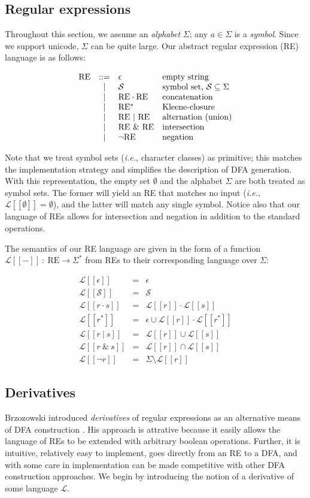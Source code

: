 \documentclass[11pt]{article}
\newcommand{\OR}{\ | \ }
\newcommand{\AND}{\ \& \ }
\newcommand{\CL}{\mathcal{L}}
\newcommand{\CS}{\mathcal{S}}
\newcommand{\Sem}[1]{[ \! [ #1 ] \! ]}
\newcommand{\Ls}[1]{\CL\Sem{#1}}
\newcommand{\ie}{{\em i.e.}}
\newcommand{\Grammar}[1]{\[ \begin{array}{rcll} #1 \end{array} \]}
\newcommand{\GFirst}[3]{#1 & ::= & #2 & \textrm{#3} \\ }
\newcommand{\GNext}[2]{ & | & #1 & \textrm{#2} \\ }
\begin{document}
\subsection{Regular expressions}

Throughout this section, we assume an \emph{alphabet} $\Sigma$; any $a \in \Sigma$ is a \emph{symbol}.  Since we support unicode, $\Sigma$ can be quite large.  Our abstract regular expression (RE) language is as follows:

\Grammar{
\GFirst{\rm RE}{\epsilon}{empty string}
\GNext{\CS}{symbol set, $\CS \subseteq \Sigma$}
\GNext{\rm RE\cdot RE}{concatenation}
\GNext{\rm RE^*}{Kleene-closure}
\GNext{\rm RE \OR RE}{alternation (union)}
\GNext{\rm RE \AND RE}{intersection}
\GNext{\neg \rm RE}{negation}
}

Note that we treat symbol sets (\ie{}, character classes) as primitive; this matches the implementation strategy and simplifies the description of DFA generation.  With this representation, the empty set $\emptyset$ and the alphabet $\Sigma$ are both treated as symbol sets.  The former will yield an RE that matches no input (\ie{}, $\CL\Sem{\emptyset} = \emptyset$), and the latter will match any single symbol.  Notice also that our language of REs allows for intersection and negation in addition to the standard operations.

The semantics of our RE language are given in the form of a function $\Ls{-} \ : \ \mathrm{RE} \rightarrow \Sigma^*$ from REs to their corresponding language over $\Sigma$:

\begin{eqnarray*}
\Ls{\epsilon} 	&=& 	\epsilon \\
\Ls{\CS}		&=& 	\CS \\
\Ls{r\cdot s}	&=& 	\Ls{r} \cdot \Ls{s} \\
\Ls{r^*}		&=& 	\epsilon \cup \Ls{r}\cdot\Ls{r^*} \\
\Ls{r \OR s}	&=&		\Ls{r} \cup \Ls{s} \\
\Ls{r \AND s}	&=& 	\Ls{r} \cap \Ls{s} \\
\Ls{\neg r}		&=& 	\Sigma \setminus \Ls{r}
\end{eqnarray*}

\subsection{Derivatives}\label{sec:derivatives}

Brzozowski introduced \emph{derivatives} of regular expressions as an alternative means of DFA construction \cite{derivatives}.  His approach is attrative because it easily allows the language of REs to be extended with arbitrary boolean operations.  Further, it is intuitive, relatively easy to implement, goes directly from an RE to a DFA, and with some care in implementation can be made competitive with other DFA construction approaches.  We begin by introducing the notion of a derivative of some language $\CL$.
\end{document}
